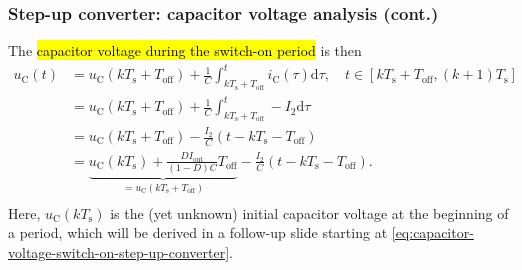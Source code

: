 \begin{frame}
    \frametitle{Step-up converter: capacitor voltage analysis (cont.)}
     The \hl{capacitor voltage during the switch-on period} is then
    \begin{equation}
        \begin{split}
            u_\mathrm{C}(t) &= u_\mathrm{C}(kT_\mathrm{s}+T_\mathrm{off}) + \frac{1}{C}\int_{kT_\mathrm{s}+T_\mathrm{off}}^t i_\mathrm{C}(\tau) \mathrm{d}\tau , \quad t\in [k T_\mathrm{s}+T_\mathrm{off}, (k+1) T_\mathrm{s}]\\
            &= u_\mathrm{C}(kT_\mathrm{s}+T_\mathrm{off}) + \frac{1}{C}\int_{kT_\mathrm{s}+T_\mathrm{off}}^t -I_2 \mathrm{d}\tau\\
                &= u_\mathrm{C}(kT_\mathrm{s}+T_\mathrm{off}) - \frac{I_2}{C}(t-kT_\mathrm{s}-T_\mathrm{off})\\
                &= \underbrace{u_\mathrm{C}(kT_\mathrm{s}) + \frac{DI_\mathrm{out}}{(1-D)C}T_\mathrm{off}}_{=u_\mathrm{C}(kT_\mathrm{s}+T_\mathrm{off})} - \frac{I_2}{C}(t-kT_\mathrm{s}-T_\mathrm{off}).\\
        \end{split}
        \label{eq:capacitor-voltage-switch-on-step-up-converter}
    \end{equation}
    Here, $u_\mathrm{C}(kT_\mathrm{s})$ is the (yet unknown)  initial capacitor voltage at the beginning of a period, which will be derived in a follow-up slide starting at \eqref{eq:capacitor-voltage-switch-on-step-up-converter}. 
\end{frame}


